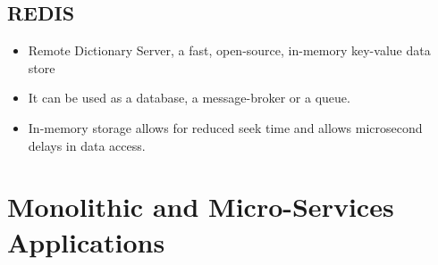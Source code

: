 \documentclass{article}
\begin{document}
\subsection{REDIS}
\begin{itemize}
    \item Remote Dictionary Server, a fast, open-source, in-memory key-value data store 
    
    \item It can be used as a database, a message-broker or a queue.
    
    \item In-memory storage allows for reduced seek time and allows microsecond delays in data access. 
\end{itemize}

\section{Monolithic and Micro-Services Applications}
\end{document}
